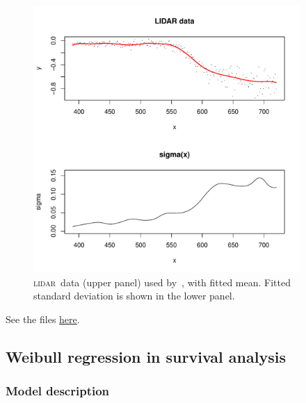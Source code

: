 \documentclass{admbmanual}
\newcommand{\citeasnoun}{\cite}
\newcommand{\scLIDAR}{\textsc{lidar}}
\begin{document}
\begin{figure}[h]
  \centering\hskip1pt
  \includegraphics[width=4in]{lidar_fig.pdf}
  \caption{\scLIDAR\ data (upper panel) used
    by~\protect\citeasnoun{rupp:wand:carr:2003}, with fitted mean. Fitted
    standard deviation is shown in the lower panel.}
  \label{fig:lidar}
\end{figure}

See the files
\href{http://otter-rsch.com/admbre/examples/lidar/lidar.html}{here}.

\subsection{Weibull regression in survival analysis}
\subsubsection{Model description}
\end{document}
